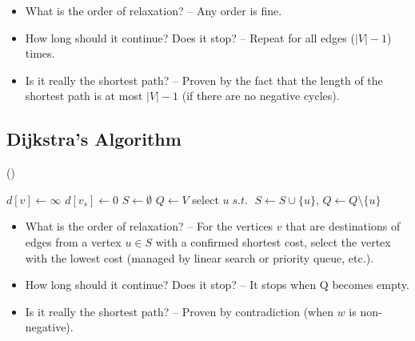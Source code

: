 \begin{itemize}
\setlength{\itemsep}{0pt}
\item What is the order of relaxation? -- Any order is fine.
\item How long should it continue? Does it stop? -- Repeat for all edges ($|V|-1$) times.
\item Is it really the shortest path? -- Proven by the fact that the length of the shortest path is at most $|V|-1$ (if there are no negative cycles).
\end{itemize}
\subsection{Dijkstra's Algorithm}\label{section:dijkstra}
(\pccbook[p.~96])

\begin{algorithmic}[1]
\State $d[v] \gets \infty$
\EndFor
\State $d[v_s] \gets 0$
\State $S\gets \emptyset$
\State $Q\gets V$ 
\label{alg:dijkstra:while}
\State select $u\; s.t.\; $\label{alg:dijkstra:pop}
\State $S \gets S \cup \{u\}$, $Q \gets Q \setminus \{u\}$
\State {}\label{alg:dijkstra:relax}
\EndFor
\EndWhile
\EndProcedure
\end{algorithmic}

\begin{itemize}
\setlength{\itemsep}{0pt}
\item What is the order of relaxation? -- For the vertices $v$ that are destinations of edges from a vertex $u\in S$ with a confirmed shortest cost, select the vertex with the lowest cost (managed by linear search or priority queue, etc.).
\item How long should it continue? Does it stop? -- It stops when Q becomes empty.
\item Is it really the shortest path? -- Proven by contradiction (when $w$ is non-negative).
\end{itemize}
